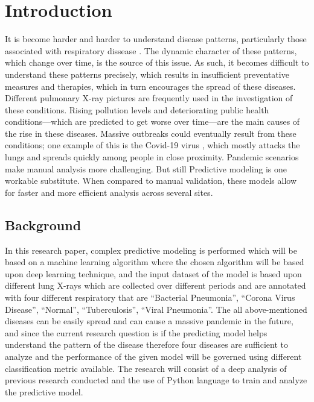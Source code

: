 \chapter{Introduction}
\label{ch:into} %

It is become harder and harder to understand disease patterns, particularly those associated with respiratory dissease \cite{Zimlich}. The dynamic character of these patterns, which change over time, is the source of this issue. As such, it becomes difficult to understand these patterns precisely, which results in insufficient preventative measures and therapies, which in turn encourages the spread of these diseases. Different pulmonary X-ray pictures are frequently used in the investigation of these conditions. Rising pollution levels and deteriorating public health conditions—which are predicted to get worse over time—are the main causes of the rise in these diseases. Massive outbreaks could eventually result from these conditions; one example of this is the Covid-19 virus \cite{WHO}, which mostly attacks the lungs and spreads quickly among people in close proximity. Pandemic scenarios make manual analysis more challenging. But still Predictive modeling is one workable substitute. When compared to manual validation, these models allow for faster and more efficient analysis across several sites.



\section{Background}
\label{sec:into_back}

In this research paper, complex predictive modeling is performed which will be based on a 
machine learning algorithm where the chosen algorithm will be based upon deep learning 
technique, and the input dataset \cite{Kaggle} of the model is based upon different lung X-rays 
which are collected over different periods and are annotated with four different respiratory 
that are “Bacterial Pneumonia”, “Corona Virus Disease”, “Normal”, “Tuberculosis”, “Viral 
Pneumonia”. The all above-mentioned diseases can be easily spread and can cause a massive 
pandemic in the future, and since the current research question is if the predicting model 
helps understand the pattern of the disease therefore four diseases are sufficient to analyze 
and the performance of the given model will be governed using different classification metric  
\cite{sultana2021using} available. The research will consist of a deep analysis of previous research 
conducted and the use of Python language to train and analyze the predictive model.

